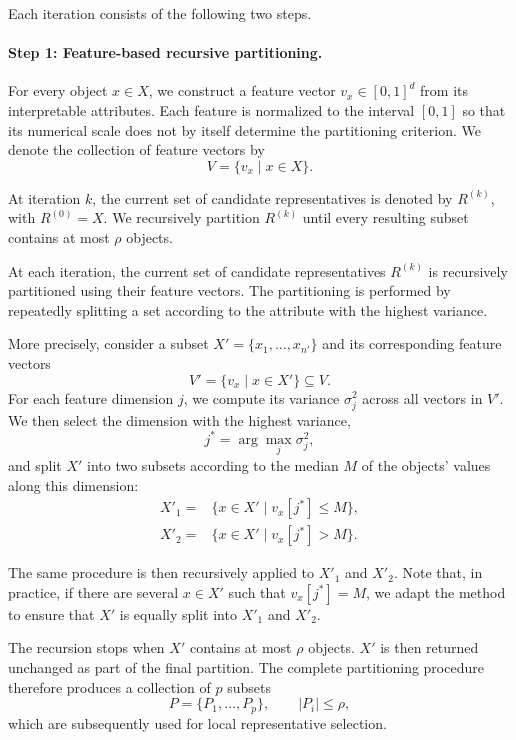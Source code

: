 \documentclass{ieeeaccess}
\newcommand{\maxpartitionsize}{\rho}
\begin{document}
Each iteration consists of the following two steps.

\paragraph*{Step 1: Feature-based recursive partitioning.}

For every object $x \in X$, we construct a feature vector $v_x \in [0,1]^d$ from its interpretable attributes. Each feature is normalized to the interval $[0,1]$ so that its numerical scale does not by itself determine the partitioning criterion. We denote the collection of feature vectors by
\[
V = \{v_x \mid x \in X\}.
\]

At iteration $k$, the current set of candidate representatives is denoted by $R^{(k)}$, with $R^{(0)}=X$. We recursively partition $R^{(k)}$ until every resulting subset contains at most $\maxpartitionsize$ objects.

At each iteration, the current set of candidate representatives $R^{(k)}$ is recursively partitioned using their feature vectors. The partitioning is performed by repeatedly splitting a set according to the attribute with the highest variance.

More precisely, consider a subset $X'=\{x_1,\dots,x_{n'}\}$ and its corresponding feature vectors
\[
V'=\{v_x\mid x\in X'\}\subseteq V.
\]
For each feature dimension $j$, we compute its variance $\sigma_j^2$ across all vectors in $V'$. We then select the dimension with the highest variance,
\[
j^*=\arg\max_j \sigma_j^2,
\]
and split $X'$ into two subsets according to the median $M$ of the objects' values along this dimension:
\begin{align*}
X'_1=&\{x\in X'\mid v_x[j^*]\leq M\},\\
X'_2=&\{x\in X'\mid v_x[j^*]>M\}.
\end{align*}

The same procedure is then recursively applied to $X'_1$ and $X'_2$.
Note that, in practice, if there are several $x\in X'$ such that $v_x[j^*] = M$, we adapt the method to ensure that $X'$ is equally split into $X'_1$ and $X'_2$.

The recursion stops when $X'$ contains at most
$\maxpartitionsize$ objects. $X'$ is then returned unchanged as part of the final partition. 
The complete partitioning procedure therefore produces a collection of $p$ subsets
\[
P=\{P_1,\ldots,P_p\},
\qquad |P_i|\leq\maxpartitionsize,
\]
which are subsequently used for local representative selection.
\end{document}
